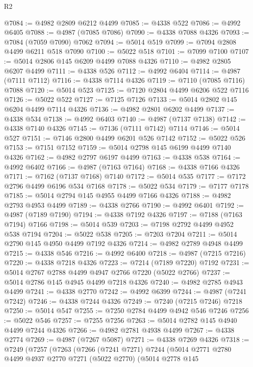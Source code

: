 \begin{lexlean}{R2}
\begin{coremodule}
@7084 := @4982 @2809 @6212 @4499
@7085 := @4338 @522
@7086 := @4992 @6405
@7088 := @4987 (@7085 @7086)
@7090 := @4338 @7088 @4326
@7093 := @7084 (@7059 @7090) @7062
@7094 := @5014 @519
@7099 := @7094 @2808 @4499 @6211 @518 @7090
@7100 := @5022 @518
@7101 := @7099 @7100
@7107 := @5014 @2806 @145 @6209 @4499 @7088 @4326
@7110 := @4982 @2805 @6207 @4499
@7111 := @4338 @526
@7112 := @4992 @6404
@7114 := @4987 (@7111 @7112)
@7116 := @4338 @7114 @4326
@7119 := @7110 (@7085 @7116) @7088
@7120 := @5014 @523
@7125 := @7120 @2804 @4499 @6206 @522 @7116
@7126 := @5022 @522
@7127 := @7125 @7126
@7133 := @5014 @2802 @145 @6204 @4499 @7114 @4326
@7136 := @4982 @2801 @6202 @4499
@7137 := @4338 @534
@7138 := @4992 @6403
@7140 := @4987 (@7137 @7138)
@7142 := @4338 @7140 @4326
@7145 := @7136 (@7111 @7142) @7114
@7146 := @5014 @527
@7151 := @7146 @2800 @4499 @6201 @526 @7142
@7152 := @5022 @526
@7153 := @7151 @7152
@7159 := @5014 @2798 @145 @6199 @4499 @7140 @4326
@7162 := @4982 @2797 @6197 @4499
@7163 := @4338 @538
@7164 := @4992 @6402
@7166 := @4987 (@7163 @7164)
@7168 := @4338 @7166 @4326
@7171 := @7162 (@7137 @7168) @7140
@7172 := @5014 @535
@7177 := @7172 @2796 @4499 @6196 @534 @7168
@7178 := @5022 @534
@7179 := @7177 @7178
@7185 := @5014 @2794 @145 @4955 @4499 @7166 @4326
@7188 := @4982 @2793 @4953 @4499
@7189 := @4338 @2766
@7190 := @4992 @6401
@7192 := @4987 (@7189 @7190)
@7194 := @4338 @7192 @4326
@7197 := @7188 (@7163 @7194) @7166
@7198 := @5014 @539
@7203 := @7198 @2792 @4499 @4952 @538 @7194
@7204 := @5022 @538
@7205 := @7203 @7204
@7211 := @5014 @2790 @145 @4950 @4499 @7192 @4326
@7214 := @4982 @2789 @4948 @4499
@7215 := @4338 @546
@7216 := @4992 @6400
@7218 := @4987 (@7215 @7216)
@7220 := @4338 @7218 @4326
@7223 := @7214 (@7189 @7220) @7192
@7231 := @5014 @2767 @2788 @4499 @4947 @2766 @7220 (@5022 @2766)
@7237 := @5014 @2786 @145 @4945 @4499 @7218 @4326
@7240 := @4982 @2785 @4943 @4499
@7241 := @4338 @2770
@7242 := @4992 @6399
@7244 := @4987 (@7241 @7242)
@7246 := @4338 @7244 @4326
@7249 := @7240 (@7215 @7246) @7218
@7250 := @5014 @547
@7255 := @7250 @2784 @4499 @4942 @546 @7246
@7256 := @5022 @546
@7257 := @7255 @7256
@7263 := @5014 @2782 @145 @4940 @4499 @7244 @4326
@7266 := @4982 @2781 @4938 @4499
@7267 := @4338 @2774
@7269 := @4987 (@7267 @5087)
@7271 := @4338 @7269 @4326
@7318 := @7249
    (@7257
      (@7263
        (@7266
          (@7241 @7271)
          @7244
          (@5014
            @2771
            @2780
            @4499
            @4937
            @2770
            @7271
            (@5022 @2770)
            (@5014
              @2778
              @145

\end{coremodule}
\end{lexlean}
